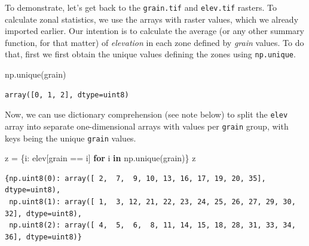 \documentclass[
  letterpaper,
]{krantz}
\newenvironment{Shaded}{\begin{snugshade}}{\end{snugshade}}
\newcommand{\ControlFlowTok}[1]{\textcolor[rgb]{0.00,0.23,0.31}{\textbf{#1}}}
\newcommand{\KeywordTok}[1]{\textcolor[rgb]{0.00,0.23,0.31}{\textbf{#1}}}
\newcommand{\NormalTok}[1]{\textcolor[rgb]{0.00,0.23,0.31}{#1}}
\newcommand{\OperatorTok}[1]{\textcolor[rgb]{0.37,0.37,0.37}{#1}}
\begin{document}
To demonstrate, let's get back to the \texttt{grain.tif} and
\texttt{elev.tif} rasters. To calculate zonal statistics, we use the
arrays with raster values, which we already imported earlier. Our
intention is to calculate the average (or any other summary function,
for that matter) of \emph{elevation} in each zone defined by
\emph{grain} values. To do that, first we first obtain the unique values
defining the zones using \texttt{np.unique}.

\begin{Shaded}
\begin{Highlighting}[]
\NormalTok{np.unique(grain)}
\end{Highlighting}
\end{Shaded}

\begin{verbatim}
array([0, 1, 2], dtype=uint8)
\end{verbatim}

Now, we can use dictionary comprehension (see note below) to split the
\texttt{elev} array into separate one-dimensional arrays with values per
\texttt{grain} group, with keys being the unique \texttt{grain} values.

\begin{Shaded}
\begin{Highlighting}[]
\NormalTok{z }\OperatorTok{=}\NormalTok{ \{i: elev[grain }\OperatorTok{==}\NormalTok{ i] }\ControlFlowTok{for}\NormalTok{ i }\KeywordTok{in}\NormalTok{ np.unique(grain)\}}
\NormalTok{z}
\end{Highlighting}
\end{Shaded}

\begin{verbatim}
{np.uint8(0): array([ 2,  7,  9, 10, 13, 16, 17, 19, 20, 35], dtype=uint8),
 np.uint8(1): array([ 1,  3, 12, 21, 22, 23, 24, 25, 26, 27, 29, 30, 32], dtype=uint8),
 np.uint8(2): array([ 4,  5,  6,  8, 11, 14, 15, 18, 28, 31, 33, 34, 36], dtype=uint8)}
\end{verbatim}
\end{document}
